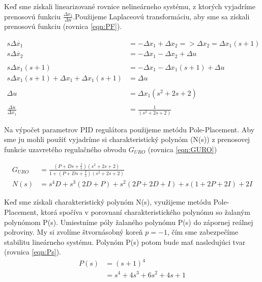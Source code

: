 \documentclass[../main.tex]{subfiles}
\begin{document}
Keď sme získali linearizované rovnice nelineárneho systému, z ktorých vyjadríme prenosovú funkciu $\frac{\Delta x_1}{\Delta u}$.Použijeme Laplaceovú transformáciu, aby sme sa získali prenosovú funkciu (rovnica \ref{eqn:PF}).

\begin{equation}
\begin{split} 
s\Delta \dot{x_1}  &= -\Delta x_1 + \Delta x_2 => \Delta x_2 = \Delta x_1(s+1) \\
s\Delta \dot{x_2} & = -\Delta x_1 - \Delta x_2 + \Delta u \\\\
s\Delta x_1(s+1) & = -\Delta x_1 - \Delta x_1(s+1) + \Delta u\\
s\Delta x_1(s+1) + \Delta x_1 + \Delta x_1(s+1) & = \Delta u\\\\
\Delta u & = \Delta x_1(s^2+2s+2)\\\\
\frac{\Delta u}{\Delta x_1} & = \frac{1}{(s^2+2s+2)}\
 \end{split}
 \label{eqn:PF}
\end{equation}	

Na výpočet parametrov PID regulátora použijeme metódu Pole-Placement. Aby sme ju mohli použiť vyjadríme si charakteristický polynóm (N(s)) z prenosovej funkcie uzavretého regulačného obvodu ${G_{URO}}$ (rovnica \ref{eqn:GURO})

\begin{equation}
	\begin{aligned}
	G_{URO} &= \frac{(P+Ds+\frac{I}{s})(s^2+2s+2)}{1+(P+Ds+\frac{I}{s})(s^2+2s+2)}  \\
		N(s)	&= s^4D+s^3(2D+P)+s^2(2P+2D+I)+s(1+2P+2I)+2I
	\end{aligned}
	\label{eqn:GURO}
\end{equation}

Keď sme získali charakteristický polynóm N(s), využijeme  metódu Pole-Placement, ktorá spočíva v porovnaní charakteristického polynómu so žalaným polynómom P(s). Umiestníme póly žalaného polynómu P(s) do zápornej reálnej polroviny. My si zvolíme štvornásobný koreň $p = -1$, čím sme zabezpečíme stabilitu lineárneho systému. Polynóm P(s) potom bude mať nasledujúci tvar (rovnica \ref{eqn:Ps}). 
\begin{equation}
	\begin{aligned}
	P(s) &= (s + 1)^4 \\
		 &= s^4+4s^3+6s^2+4s+1 \\
	\end{aligned}
\label{eqn:Ps}
\end{equation}
\end{document}
